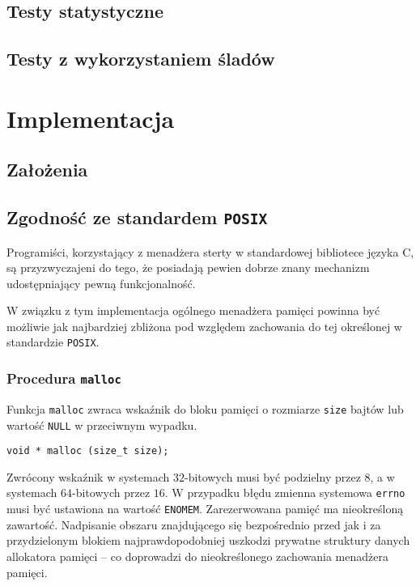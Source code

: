 \documentclass[12pt,a4paper,titlepage,twoside]{mwart}
\begin{document}
\subsection{Testy statystyczne}

\subsection{Testy z wykorzystaniem śladów}

\newpage


\section{Implementacja}
\hypertarget{Implementacja}{}

\subsection{Założenia}

\newpage

\subsection{Zgodność ze standardem \texttt{POSIX}}

Programiści, korzystający z menadżera sterty w standardowej bibliotece języka
C, są przyzwyczajeni do tego, że posiadają pewien dobrze znany mechanizm
udostępniający pewną funkcjonalność.

W związku z tym implementacja ogólnego menadżera pamięci powinna być możliwie
jak najbardziej zbliżona pod względem zachowania do tej określonej w
standardzie \texttt{POSIX}.

\subsubsection{Procedura \texttt{malloc}}

Funkcja \texttt{malloc} zwraca wskaźnik do bloku pamięci o rozmiarze
\texttt{size} bajtów lub wartość \texttt{NULL} w przeciwnym wypadku.

\vspace{2ex}
\begin{lstlisting}[caption={Prototyp procedury \texttt{malloc}.}]
void * malloc (size_t size);
\end{lstlisting}

Zwrócony wskaźnik w systemach $32$-bitowych musi być podzielny przez $8$, a w
systemach $64$-bitowych przez $16$. W przypadku błędu zmienna systemowa
\texttt{errno} musi być ustawiona na wartość \texttt{ENOMEM}. Zarezerwowana
pamięć ma nieokreśloną zawartość. Nadpisanie obszaru znajdującego się
bezpośrednio przed jak i za przydzielonym blokiem najprawdopodobniej uszkodzi
prywatne struktury danych allokatora pamięci -- co doprowadzi do nieokreślonego
zachowania menadżera pamięci.
\end{document}
